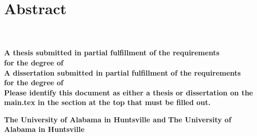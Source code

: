 
\chapter{Abstract}
     \begin{center}
        \large
        \singlespacing
        \textbf{\thesistitle}\\
        \vspace{0.5cm}
        \large
        \textbf{\studentname}\\
        \vspace{0.5cm}
        \normalsize
        \ifdefined\thesis
        \textbf{A thesis submitted in partial fulfillment of the requirements \\for the degree of \degree}\\
        \else
        \ifdefined\dissertation
        \textbf{A dissertation submitted in partial fulfillment of the requirements \\for the degree of \degree}\\
        \else
        \textbf{Please identify this document as either a thesis or dissertation on the main.tex in the section at the top that must be filled out.}\\
    \fi
    \fi
        \vspace{1cm}
        \textbf{\department}

        \vspace{0.25cm}

        \ifdefined\jointuni
        \textbf{The University of Alabama in Huntsville and  \jointuni}
        \else
        \textbf{The University of Alabama in Huntsville}
    \fi


        \vspace{0.1cm}
        \textbf{\gradmonth\ \gradyear}



    \end{center}
\vspace{0.1cm}

\doublespacing


